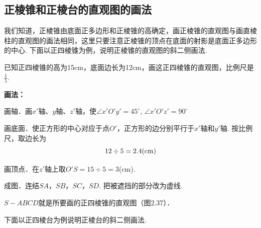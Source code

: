 \subsection{正棱锥和正棱台的直观图的画法}
我们知道，正棱锥由底面正多边形和正棱锥的高确定，画正棱锥的直观图与画直棱柱的直观图的画法相同，这里只要注意正棱锥的顶点在底面的射影是底面正多边形的中心. 下面以正四棱锥为例，说明正棱锥的直观图的斜二侧画法.


\begin{example}
    已知正四棱锥的高为15cm，底面边长为12cm，画这正四棱锥的直观图，比例尺是$\frac{1}{5}$.
\end{example}


\begin{solution}
\textbf{画法：}
\begin{enumerate}[(1)]
    \item 画轴．画$x'$轴、$y$轴、$z'$轴，使$\angle x'O'y'=45^{\circ}$, $\angle x'O'z'=90^{\circ}$

    \noindent
    \begin{minipage}{.5\textwidth}
    \item 画底面．使正方形的中心对应于点$O'$，正方形的边分别平行于$x'$轴和$y'$轴. 按比例尺，取边长为
\[12\div 5=2.4({\rm cm })\]

\item 画顶点．在$z'$轴上取$O'S=15\div 5=3$(cm).
\item 成图．连结$SA$，$SB$，$SC$，$SD$. 把被遮挡的部分改为虚线.    
    \end{minipage}
    \hfill
    \begin{minipage}{.48\textwidth}
    \centering
    \end{minipage}
\end{enumerate}

$S-ABCD$就是所要画的正四棱锥的直观图（图2.37）．
\end{solution}


下面以正四棱台为例说明正棱台的斜二侧画法.

